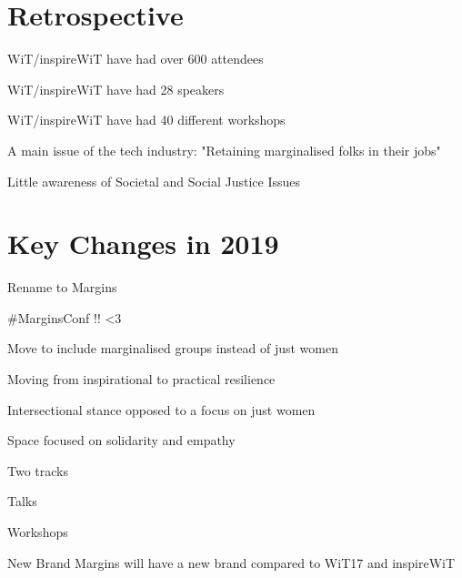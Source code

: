 \documentclass[11pt,hacksoc]{meetingmins}
\begin{document}
\maketitle

\section{Retrospective}
\begin{items}

\item
WiT/inspireWiT have had over 600 attendees

\item
WiT/inspireWiT have had 28 speakers

\item
WiT/inspireWiT have had 40 different workshops

\item
A main issue of the tech industry: "Retaining marginalised folks in their jobs"

	\subitem
	Little awareness of Societal and Social Justice Issues

	
\end{items}


\section{Key Changes in 2019}
\begin{items}
\item
Rename to Margins

	\subitem
	\#MarginsConf !! <3
	
	\subitem
	Move to include marginalised groups instead of just women
	
\item
Moving from inspirational to practical resilience
	
	\subitem
	Intersectional stance opposed to a focus on just women
	
	\subitem
	Space focused on solidarity and empathy	

\item
Two tracks

	\subitem
	Talks
	
	\subitem
	Workshops
	
\item
New Brand
	\subitem
	Margins will have a new brand compared to WiT17 and inspireWiT
	
	\subitem
	
	\subitem

\end{items}
	
\end{document}
